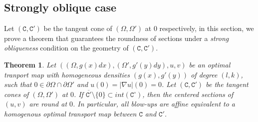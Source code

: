 \documentclass[12pt,reqno]{amsart}
\newtheorem{theorem}{Theorem}[section]
\numberwithin{equation}{section}
\begin{document}
        \subsection{Strongly oblique case} Let $(\mathtt C, \mathtt C')$ be the tangent cone of $(\Omega, \Omega')$ at $0$ respectively, in this section, we prove a theorem that guarantees the roundness of sections under a {\em strong obliqueness} condition on the geometry of $(\mathtt C, \mathtt C')$. 
        
        \begin{theorem}\label{thm: strong-oblique-implies-round}
            Let $((\Omega, g(x)dx), (\Omega', g'(y)dy), u, v)$ be an optimal tranport map with homogeneous densities $(g(x), g'(y))$ of degree $(l, k)$, such that $0\in \partial\Omega\cap\partial\Omega'$ and $u(0) = |\nabla u|(0) = 0$. Let $(\mathtt C, \mathtt C')$ be the tangent cones of $(\Omega, \Omega')$ at $0$. If $\overline{\mathtt C'}\setminus \{0\}\subset int(\mathtt C^{\circ})$, then the centered sections of $(u, v)$ are round at $0$. In particular, all blow-ups are affine equivalent to a homogenous optimal transport map between $\mathtt C$ and $\mathtt C'$. 
        \end{theorem}
\end{document}
